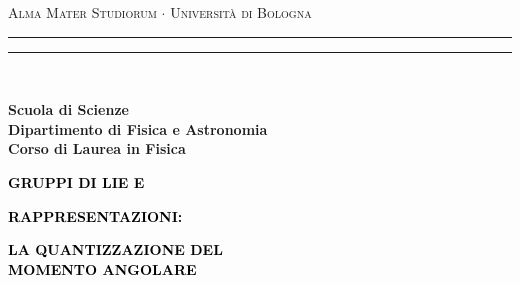 \documentclass[12pt,a4paper]{report}
\theoremstyle{definition}
\theoremstyle{Theorem}
\theoremstyle{definition}
\theoremstyle{definition}
\theoremstyle{definition}
\begin{document}
	\begin{frontespizio}
			\begin{titlepage}
			\begin{center}
				{{\Large{\textsc{Alma Mater Studiorum $\cdot$ Universit\`a di Bologna}}}} 
				\rule[0.1cm]{15.8cm}{0.1mm}
				\rule[0.5cm]{15.8cm}{0.6mm}
				\\\vspace{3mm}
				
				{\small{\bf Scuola di Scienze \\ 
						Dipartimento di Fisica e Astronomia\\
						Corso di Laurea in Fisica}}
				
			\end{center}
			
			\vspace{23mm}
			
			\begin{center}\textcolor{black}{
					{\LARGE{\bf GRUPPI DI LIE E }}
			}\end{center}
		\begin{center}\textcolor{black}{
				{\LARGE{\bf RAPPRESENTAZIONI:}}\\
		}\end{center}
	\begin{center}\textcolor{black}{
			{\LARGE{\bf LA QUANTIZZAZIONE DEL}}\\
			\vspace{0.25cm}
			{\LARGE{\bf MOMENTO ANGOLARE}}
	}\end{center}
			
			\vspace{50mm} \par \noindent
			

\end{titlepage}
\end{frontespizio}
\end{document}
